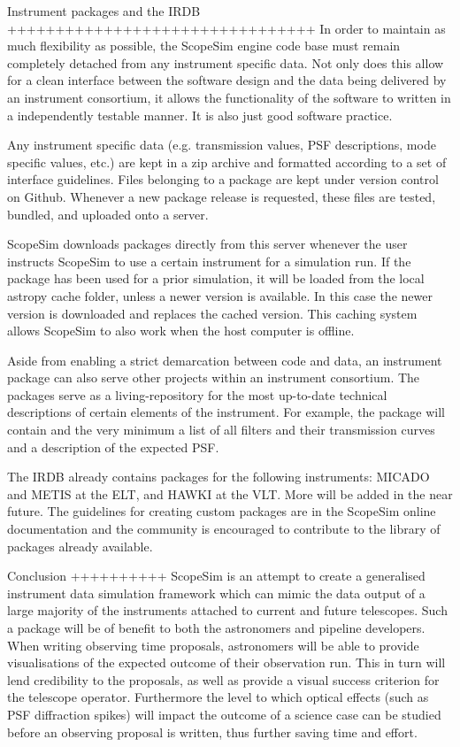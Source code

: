 Instrument packages and the IRDB
++++++++++++++++++++++++++++++++
In order to maintain as much flexibility as possible, the ScopeSim engine
code base must remain completely detached from any instrument specific data.
Not only does this allow for a clean interface between the software design and
the data being delivered by an instrument consortium, it allows the
functionality of the software to written in a independently testable manner.
It is also just good software practice.

Any instrument specific data (e.g. transmission values, PSF
descriptions, mode specific values, etc.) are kept in a zip archive and
formatted according to a set of interface guidelines. Files belonging to a
package are kept under version control on Github. Whenever a new package release
is requested, these files are tested, bundled, and uploaded onto a server.

ScopeSim downloads packages directly from this server whenever the user
instructs ScopeSim to use a certain instrument for a simulation run. If the
package has been used for a prior simulation, it will be loaded from the local
astropy cache folder, unless a newer version is available. In this case the
newer version is downloaded and replaces the cached version. This caching system
allows ScopeSim to also work when the host computer is offline.

Aside from enabling a strict demarcation between code and data, an
instrument package can also serve other projects within an instrument
consortium. The packages serve as a living-repository for the most up-to-date
technical descriptions of certain elements of the instrument. For example, the
package will contain and the very minimum a list of all filters and their
transmission curves and a description of the expected PSF.

The IRDB already contains packages for the following instruments: MICADO and
METIS at the ELT, and HAWKI at the VLT. More will be added in the near future.
The guidelines for creating custom packages are in the ScopeSim online
documentation and the community is encouraged to contribute to the library of
packages already available.


Conclusion
++++++++++
ScopeSim is an attempt to create a generalised instrument data simulation
framework which can mimic the data output of a large majority of the instruments
attached to current and future telescopes. Such a package will be of benefit to
both the astronomers and pipeline developers. When writing observing
time proposals, astronomers will be able to provide visualisations of the
expected outcome of their observation run. This in turn will lend credibility
to the proposals, as well as provide a visual success criterion for the
telescope operator. Furthermore the level to which optical effects (such as PSF
diffraction spikes) will impact the outcome of a science case can be studied
before an observing proposal is written, thus further saving time and effort.
